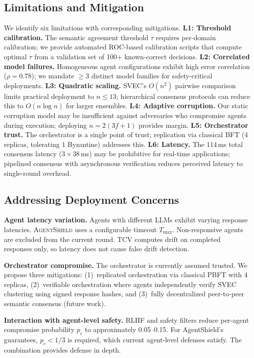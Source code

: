 \documentclass[journal,10pt]{IEEEtran}
\begin{document}
\subsection{Limitations and Mitigation}
We identify six limitations with corresponding mitigations. \textbf{L1: Threshold calibration.} The semantic agreement threshold $\tau$ requires per-domain calibration; we provide automated ROC-based calibration scripts that compute optimal $\tau$ from a validation set of 100+ known-correct decisions. \textbf{L2: Correlated model failures.} Homogeneous agent configurations exhibit high error correlation ($\rho = 0.78$); we mandate $\geq 3$ distinct model families for safety-critical deployments. \textbf{L3: Quadratic scaling.} SVEC's $O(n^2)$ pairwise comparison limits practical deployment to $n \leq 13$; hierarchical consensus protocols can reduce this to $O(n \log n)$ for larger ensembles. \textbf{L4: Adaptive corruption.} Our static corruption model may be insufficient against adversaries who compromise agents during execution; deploying $n = 2(3f+1)$ provides margin. \textbf{L5: Orchestrator trust.} The orchestrator is a single point of trust; replication via classical BFT (4 replicas, tolerating 1 Byzantine) addresses this. \textbf{L6: Latency.} The 114\,ms total consensus latency ($3 \times 38$\,ms) may be prohibitive for real-time applications; pipelined consensus with asynchronous verification reduces perceived latency to single-round overhead.

\subsection{Addressing Deployment Concerns}

\textbf{Agent latency variation.} Agents with different LLMs exhibit varying response latencies. \textsc{AgentShield} uses a configurable timeout $T_{\max}$. Non-responsive agents are excluded from the current round. TCV computes drift on completed responses only, so latency does not cause false drift detection.

\textbf{Orchestrator compromise.} The orchestrator is currently assumed trusted. We propose three mitigations: (1)~replicated orchestration via classical PBFT with 4 replicas, (2)~verifiable orchestration where agents independently verify SVEC clustering using signed response hashes, and (3)~fully decentralized peer-to-peer semantic consensus (future work).

\textbf{Interaction with agent-level safety.} RLHF and safety filters reduce per-agent compromise probability $p_c$ to approximately 0.05--0.15. For AgentShield's guarantees, $p_c < 1/3$ is required, which current agent-level defenses satisfy. The combination provides defense in depth.
\end{document}
